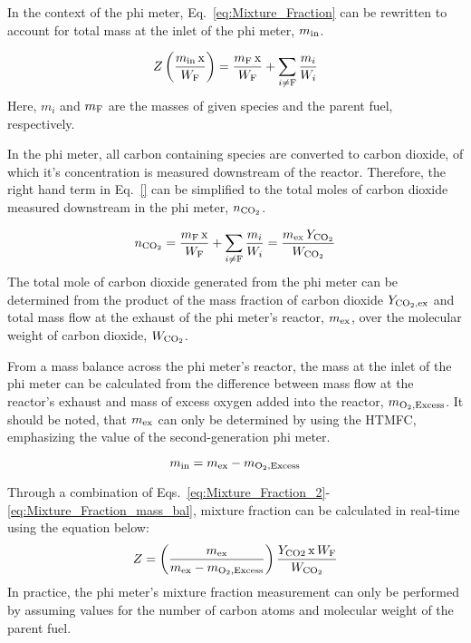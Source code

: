 \documentclass[12pt,letterpaper]{article}
\begin{document}
\begin{flushleft}
In the context of the phi meter, Eq.~\ref{eq:Mixture_Fraction} can be rewritten to account for total mass at the inlet of the phi meter, $m_{\rm{in}}$. 

\begin{equation}\label{eq:Mixture_Fraction_2}
  Z \left(\frac{m_{\rm{in}}\,{\rm x}}{W_{\rm F}}\right)= \frac{m_{\rm{F}}\,{\rm x}}{W_{\rm F}} + \sum_{i\ne {\rm F}} \frac{{m}_i}{W_{i}}
\end{equation}
Here, ${m}_i$ and $m_{\rm{F}}$ are the masses of given species and the parent fuel, respectively. 

In the phi meter, all carbon containing species are converted to carbon dioxide, of which it's concentration is measured downstream of the reactor. Therefore, the right hand term in Eq.~\ref{} can be simplified to the total moles of carbon dioxide measured downstream in the phi meter, $n_{\rm{CO_2}}$. 

\begin{equation}\label{eq:Mixture_Fraction_3}
 n_{\rm{CO_2}}= \frac{m_{\rm{F}}\,{\rm x}}{W_{\rm F}} + \sum_{i\ne {\rm F}} \frac{{m}_i}{W_{i}}=\frac{m_{\rm{ex}}\,{Y_{\rm{CO_2}}}}{W_{\rm CO_2}}
\end{equation}
The total mole of carbon dioxide generated from the phi meter can be determined from the product of the mass fraction of carbon dioxide $Y_{\rm{CO_{2},ex}}$ and total mass flow at the exhaust of the phi meter's reactor, $m_{\rm{ex}}$, over the molecular weight of carbon dioxide, ${W_{\rm CO_2}}$. 

From a mass balance across the phi meter's reactor, the mass at the inlet of the phi meter can be calculated from the difference between mass flow at the reactor's exhaust and mass of excess oxygen added into the reactor, $m_{\rm{O_{2},Excess}}$. It should be noted, that $m_{\rm{ex}}$ can only be determined by using the HTMFC, emphasizing the value of the second-generation phi meter.

\begin{equation}\label{eq:Mixture_Fraction_mass_bal}
m_{\rm{in}}=m_{\rm{ex}}-m_{\rm{O_{2},Excess}}
\end{equation}

Through a combination of Eqs.~\ref{eq:Mixture_Fraction_2}-\ref{eq:Mixture_Fraction_mass_bal}, mixture fraction can be calculated in real-time using the equation below:
\begin{equation}\label{eq:Mixture_Fraction_2}
Z = \left(\frac{m_{\rm{ex}}}{m_{\rm{ex}}-m_{\rm{O_{2},Excess}}}\right)\frac{Y_{\rm{CO2}}\,{\rm x}\,W_{\rm F}}{W_{\rm CO_2}}
\end{equation}
In practice, the phi meter's mixture fraction measurement can only be performed by assuming values for the number of carbon atoms and molecular weight of the parent fuel.    


\end{flushleft}
\end{document}

